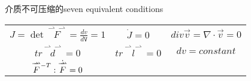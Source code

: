 \documentclass[12pt, a4paper, oneside, UTF8]{ctexbook}  %
\newcommand{\vvec}{\overset{\rightharpoonup\!\!\!\! \rightharpoonup}}
\newcommand{\lmT}{\raisebox{-0.85ex}{$\scriptstyle -T$}} %
\begin{document}
\begin{example}
	介质不可压缩的seven equivalent conditions
\begin{center}
		\begin{tabular*}{0.7\textwidth}{@{\extracolsep{\fill}}ccc@{}}
			\(J=\det\vvec{F}=\frac{dv}{d\mathtt{V}}=1\) & \(\dot{J}=0\) &	\(div\vec{v}=\nabla\cdot\vec{v}=0\)\\
			\(tr\vvec{d}=0\) & \(tr\vvec{l}=0\) & \(dv=constant\)\\
			\(\vvec{F}^{\lmT}:\dot{\vvec{F}}=0\) & & \\
		\end{tabular*}
\end{center}
\end{example}









\ifx\allfiles\undefined
\end{document}
